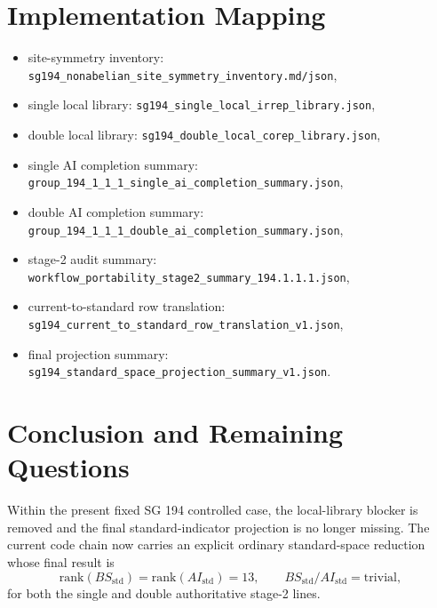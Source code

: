 \documentclass[11pt]{article}
\begin{document}
\section{Implementation Mapping}
\begin{itemize}
\item site-symmetry inventory: \texttt{sg194\_nonabelian\_site\_symmetry\_inventory.md/json},
\item single local library: \texttt{sg194\_single\_local\_irrep\_library.json},
\item double local library: \texttt{sg194\_double\_local\_corep\_library.json},
\item single AI completion summary: \texttt{group\_194\_1\_1\_1\_single\_ai\_completion\_summary.json},
\item double AI completion summary: \texttt{group\_194\_1\_1\_1\_double\_ai\_completion\_summary.json},
\item stage-2 audit summary: \texttt{workflow\_portability\_stage2\_summary\_194.1.1.1.json},
\item current-to-standard row translation: \texttt{sg194\_current\_to\_standard\_row\_translation\_v1.json},
\item final projection summary: \texttt{sg194\_standard\_space\_projection\_summary\_v1.json}.
\end{itemize}

\section{Conclusion and Remaining Questions}
Within the present fixed SG 194 controlled case, the local-library blocker is removed and the final standard-indicator projection is no longer missing. The current code chain now carries an explicit ordinary standard-space reduction whose final result is
\[
\mathrm{rank}(BS_{\mathrm{std}}) = \mathrm{rank}(AI_{\mathrm{std}}) = 13,
\qquad
BS_{\mathrm{std}}/AI_{\mathrm{std}} = \mathrm{trivial},
\]
for both the single and double authoritative stage-2 lines.
\end{document}
